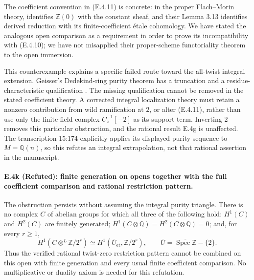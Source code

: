 The coefficient convention in (E.4.11) is concrete: in the proper
Flach--Morin theory, \citet[Proposition 6.11]{D_FlachMorin2018}
identifies $\mathbb Z(0)$ with the constant sheaf, and their
Lemma 3.13 identifies derived reduction with its finite-coefficient
\'etale cohomology. We have stated the analogous open comparison as
a requirement in order to prove its incompatibility with (E.4.10);
we have not misapplied their proper-scheme functoriality theorem to
the open immersion.

This counterexample explains a specific failed route toward the
all-twist integral extension. Geisser's Dedekind-ring purity theorem
has a truncation and a residue-characteristic qualification
\citep[Theorem 1.2(1)]{D_GeisserDedekind2004}. The missing qualification
cannot be removed in the stated coefficient theory. A corrected
integral localization theory must retain a nonzero contribution from
wild ramification at $2$, or alter (E.4.11), rather than use only the
finite-field complex $C_z^{-1}[-2]$ as its support term. Inverting $2$
removes this particular obstruction, and the rational result E.4g
is unaffected. The transcription 15:174 explicitly applies its displayed
purity sequence to $M=\mathbb Q(n)$, so this refutes an integral
extrapolation, not that rational assertion in the manuscript.

\paragraph{E.4k (Refuted): finite generation on opens together with the full coefficient comparison and rational restriction pattern.}
The obstruction persists without assuming the integral purity triangle.
There is no complex $C$ of abelian groups for which all three of the
following hold: $H^1(C)$ and $H^2(C)$ are finitely generated;
$H^1(C\otimes\mathbb Q)=H^2(C\otimes\mathbb Q)=0$;
and, for every $r\geq1$,
\[
 H^1(C\otimes^L\mathbb Z/2^r)
      \simeq H^1(\overline U_{\mathrm{et}},\mathbb Z/2^r),
 \qquad \overline U=
 \overline{\operatorname{Spec}\mathbb Z}-\{2\}.
 \tag{E.4.12}
\]
Thus the verified rational twist-zero restriction pattern cannot be
combined on this open with finite generation and every usual finite
coefficient comparison. No multiplicative or duality axiom is needed
for this refutation.

